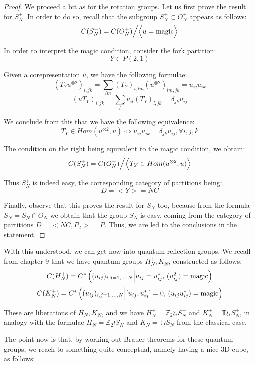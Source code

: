 \documentclass[12pt]{amsbook}
\begin{document}
\begin{proof}
We proceed a bit as for the rotation groups. Let us first prove the result for $S_N^+$. In order to do so, recall that the subgroup $S_N^+\subset O_N^+$ appears as follows:
$$C(S_N^+)=C(O_N^+)\Big\slash\Big<u={\rm magic}\Big>$$

In order to interpret the magic condition, consider the fork partition:
$$Y\in P(2,1)$$

Given a corepresentation $u$, we have the following formulae:
$$(T_Yu^{\otimes 2})_{i,jk}
=\sum_{lm}(T_Y)_{i,lm}(u^{\otimes 2})_{lm,jk}
=u_{ij}u_{ik}$$
$$(uT_Y)_{i,jk}
=\sum_lu_{il}(T_Y)_{l,jk}
=\delta_{jk}u_{ij}$$

We conclude from this that we have the following equivalence:
$$T_Y\in Hom(u^{\otimes 2},u)\iff u_{ij}u_{ik}=\delta_{jk}u_{ij},\forall i,j,k$$

The condition on the right being equivalent to the magic condition, we obtain:
$$C(S_N^+)=C(O_N^+)\Big\slash\Big<T_Y\in Hom(u^{\otimes 2},u)\Big>$$

Thus $S_N^+$ is indeed easy, the corresponding category of partitions being:
$$D=<Y>=NC$$

Finally, observe that this proves the result for $S_N$ too, because from the formula $S_N=S_N^+\cap O_N$ we obtain that the group $S_N$ is easy, coming from the category of partitions $D=<NC,P_2>=P$. Thus, we are led to the conclusions in the statement.
\end{proof}

With this understood, we can get now into quantum reflection groups. We recall from chapter 9 that we have quantum groups $H_N^+,K_N^+$, constructed as follows:
$$C(H_N^+)=C^*\left((u_{ij})_{i,j=1,\ldots,N}\Big|u_{ij}=u_{ij}^*,\,(u_{ij}^2)={\rm magic}\right)$$
$$C(K_N^+)=C^*\left((u_{ij})_{i,j=1,\ldots,N}\Big|[u_{ij},u_{ij}^*]=0,\,(u_{ij}u_{ij}^*)={\rm magic}\right)$$

These are liberations of $H_N,K_N$, and we have $H_N^+=\mathbb Z_2\wr_*S_N^+$ and $K_N^+=\mathbb T\wr_*S_N^+$, in analogy with the formulae $H_N=\mathbb Z_2\wr S_N$ and  $K_N=\mathbb T\wr S_N$ from the classical case.

\bigskip

The point now is that, by working out Brauer theorems for these quantum groups, we reach to something quite conceptual, namely having a nice 3D cube, as follows:

\end{document}
